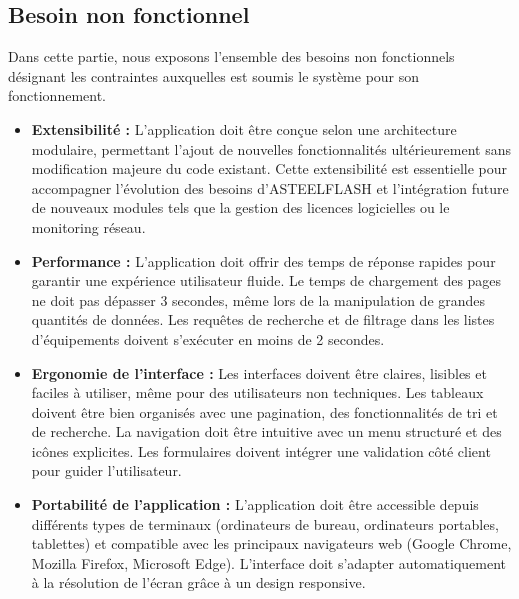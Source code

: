     \subsection{Besoin non fonctionnel}
Dans cette partie, nous exposons l’ensemble des besoins non fonctionnels désignant les contraintes auxquelles est soumis le système pour son fonctionnement.

    \begin{itemize}[label=\textbullet,font=\normalsize]
    
        \item \textbf{Extensibilit\'{e} :} L'application doit \^{e}tre con\c{c}ue selon une architecture modulaire, permettant l'ajout de nouvelles fonctionnalit\'{e}s ult\'{e}rieurement sans modification majeure du code existant. Cette extensibilit\'{e} est essentielle pour accompagner l'\'{e}volution des besoins d'ASTEELFLASH et l'int\'{e}gration future de nouveaux modules tels que la gestion des licences logicielles ou le monitoring r\'{e}seau.
        
        \item \textbf{Performance :} L'application doit offrir des temps de r\'{e}ponse rapides pour garantir une exp\'{e}rience utilisateur fluide. Le temps de chargement des pages ne doit pas d\'{e}passer 3 secondes, m\^{e}me lors de la manipulation de grandes quantit\'{e}s de donn\'{e}es. Les requ\^{e}tes de recherche et de filtrage dans les listes d'\'{e}quipements doivent s'ex\'{e}cuter en moins de 2 secondes.
        
        \item \textbf{Ergonomie de l'interface :} Les interfaces doivent \^{e}tre claires, lisibles et faciles \`{a} utiliser, m\^{e}me pour des utilisateurs non techniques. Les tableaux doivent \^{e}tre bien organis\'{e}s avec une pagination, des fonctionnalit\'{e}s de tri et de recherche. La navigation doit \^{e}tre intuitive avec un menu structur\'{e} et des ic\^{o}nes explicites. Les formulaires doivent int\'{e}grer une validation c\^{o}t\'{e} client pour guider l'utilisateur.
        
        \item \textbf{Portabilit\'{e} de l'application :} L'application doit \^{e}tre accessible depuis diff\'{e}rents types de terminaux (ordinateurs de bureau, ordinateurs portables, tablettes) et compatible avec les principaux navigateurs web (Google Chrome, Mozilla Firefox, Microsoft Edge). L'interface doit s'adapter automatiquement \`{a} la r\'{e}solution de l'\'{e}cran gr\^{a}ce \`{a} un design responsive.
        

\end{itemize}
